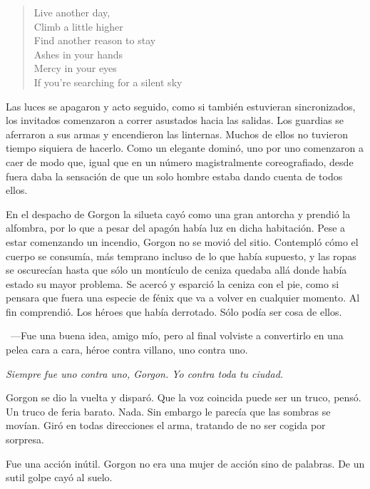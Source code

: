 \begin{verse}
    \begin{em}
        Live another day,\\
        Climb a little higher\\
        Find another reason to stay\\
        Ashes in your hands\\
        Mercy in your eyes\\
        If you're searching for a silent sky\\
    \end{em}
\end{verse}

Las luces se apagaron y acto seguido, como si también estuvieran sincronizados, los invitados comenzaron a correr asustados hacia las salidas. Los guardias se aferraron a sus armas y encendieron las linternas. Muchos de ellos no tuvieron tiempo siquiera de hacerlo. Como un elegante dominó, uno por uno comenzaron a caer de modo que, igual que en un número magistralmente coreografiado, desde fuera daba la sensación de que un solo hombre estaba dando cuenta de todos ellos.

\parbreak
En el despacho de Gorgon la silueta cayó como una gran antorcha y prendió la alfombra, por lo que a pesar del apagón había luz en dicha habitación. Pese a estar comenzando un incendio, Gorgon no se movió del sitio. Contempló cómo el cuerpo se consumía, más temprano incluso de lo que había supuesto, y las ropas se oscurecían hasta que sólo un montículo de ceniza quedaba allá donde había estado su mayor problema. Se acercó y esparció la ceniza con el pie, como si pensara que fuera una especie de fénix que va a volver en cualquier momento. Al fin comprendió. Los héroes que había derrotado. Sólo podía ser cosa de ellos.

~---Fue una buena idea, amigo mío, pero al final volviste a convertirlo en una pelea cara a cara, héroe contra villano, uno contra uno.

\emph{Siempre fue uno contra uno, Gorgon. Yo contra toda tu ciudad.}

Gorgon se dio la vuelta y disparó. Que la voz coincida puede ser un truco, pensó. Un truco de feria barato. Nada. Sin embargo le parecía que las sombras se movían. Giró en todas direcciones el arma, tratando de no ser cogida por sorpresa.

Fue una acción inútil. Gorgon no era una mujer de acción sino de palabras. De un sutil golpe cayó al suelo.

